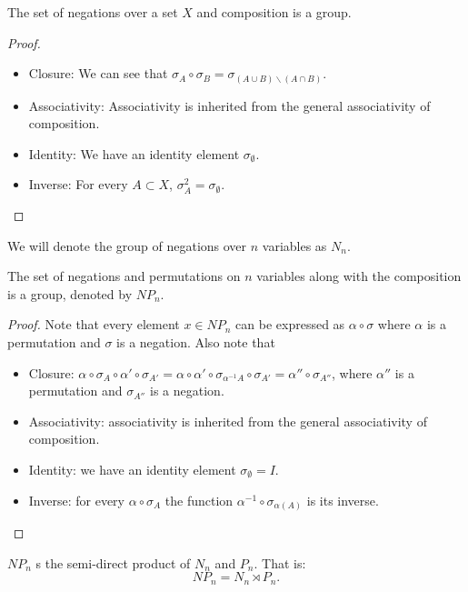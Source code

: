 \begin{proposition}
  The set of negations over a set $X$ and composition is a group.
\end{proposition}
\begin{proof}\hfill 
  \begin{itemize}
    \item Closure: We can see that $\sigma_{A}\circ\sigma_{B} = \sigma_{(A\cup B)\backslash (A\cap B)}$.
    \item Associativity: Associativity is inherited from the general associativity of composition.
    \item Identity: We have an identity element $\sigma_{\emptyset}$.
    \item Inverse: For every $A\subset X$, $\sigma_{A}^2 = \sigma_{\emptyset}$.
  \end{itemize}
\end{proof}

We will denote the group of negations over $n$ variables as $N_n$.

\begin{proposition}[$NP_n$]
  The set of negations and permutations on $n$ variables  along with the composition is a group, denoted by $NP_n$. 
\end{proposition}
\begin{proof}
  Note that every element $x\in NP_n$ can be expressed as $\alpha\circ \sigma$ where $\alpha$ is a permutation and $\sigma$ is a negation. Also note that 
  \begin{itemize}
    \item Closure: $\alpha\circ \sigma_{A} \circ \alpha'\circ \sigma_{A'} = \alpha \circ \alpha' \circ \sigma_{\alpha^{-1} A} \circ \sigma_{A'}  = \alpha''\circ \sigma_{A''}$, where $\alpha''$ is a permutation and $\sigma_{A''}$ is a negation.
    \item Associativity: associativity is inherited from the general associativity of composition.
    \item Identity: we have an identity element $\sigma_{\emptyset}=I$.
    \item Inverse: for every $\alpha \circ \sigma_A$ the function $\alpha^{-1}\circ \sigma_{\alpha(A)}$ is its inverse.
  \end{itemize}
\end{proof}

\begin{proposition}
  $NP_n$ s the semi-direct product of $N_n$ and $P_n$. That is:
   $$NP_n = N_n \rtimes P_n.$$
 \end{proposition}
 
